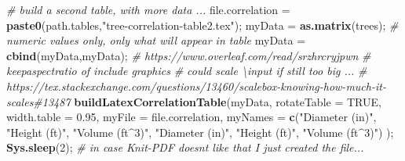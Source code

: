 \documentclass[]{article}
\newenvironment{Shaded}{\begin{snugshade}}{\end{snugshade}}
\newcommand{\CommentTok}[1]{\textcolor[rgb]{0.56,0.35,0.01}{\textit{#1}}}
\newcommand{\DataTypeTok}[1]{\textcolor[rgb]{0.13,0.29,0.53}{#1}}
\newcommand{\DecValTok}[1]{\textcolor[rgb]{0.00,0.00,0.81}{#1}}
\newcommand{\FloatTok}[1]{\textcolor[rgb]{0.00,0.00,0.81}{#1}}
\newcommand{\KeywordTok}[1]{\textcolor[rgb]{0.13,0.29,0.53}{\textbf{#1}}}
\newcommand{\NormalTok}[1]{#1}
\newcommand{\OtherTok}[1]{\textcolor[rgb]{0.56,0.35,0.01}{#1}}
\newcommand{\StringTok}[1]{\textcolor[rgb]{0.31,0.60,0.02}{#1}}
\begin{document}
\begin{Shaded}
\begin{Highlighting}[]
\CommentTok{\# build a second table, with more data ... }
\NormalTok{file.correlation =}\StringTok{ }\KeywordTok{paste0}\NormalTok{(path.tables,}\StringTok{"tree{-}correlation{-}table2.tex"}\NormalTok{);}
\NormalTok{myData =}\StringTok{ }\KeywordTok{as.matrix}\NormalTok{(trees);  }\CommentTok{\# numeric values only, only what will appear in table}
\NormalTok{myData =}\StringTok{ }\KeywordTok{cbind}\NormalTok{(myData,myData);}
\CommentTok{\# https://www.overleaf.com/read/srzhrcryjpwn}
\CommentTok{\# keepaspectratio of include graphics }
\CommentTok{\# could scale \textbackslash{}input if still too big ...}
\CommentTok{\# https://tex.stackexchange.com/questions/13460/scalebox{-}knowing{-}how{-}much{-}it{-}scales\#13487}
\KeywordTok{buildLatexCorrelationTable}\NormalTok{(myData, }
  \DataTypeTok{rotateTable =} \OtherTok{TRUE}\NormalTok{,}
  \DataTypeTok{width.table =} \FloatTok{0.95}\NormalTok{,}
  \DataTypeTok{myFile =}\NormalTok{ file.correlation,}
  \DataTypeTok{myNames =} \KeywordTok{c}\NormalTok{(}\StringTok{"Diameter (in)"}\NormalTok{, }\StringTok{"Height (ft)"}\NormalTok{, }\StringTok{"Volume (ft$\^{}3$)"}\NormalTok{, }\StringTok{"Diameter (in)"}\NormalTok{, }\StringTok{"Height (ft)"}\NormalTok{, }\StringTok{"Volume (ft$\^{}3$)"}\NormalTok{) );}
\KeywordTok{Sys.sleep}\NormalTok{(}\DecValTok{2}\NormalTok{); }\CommentTok{\# in case Knit{-}PDF doesn\textquotesingle{}t like that I just created the file...}
\end{Highlighting}
\end{Shaded}

\newpage



\newpage






\newpage
\theendnotes

\newpage
\begin{auxmulticols}{2}
\singlespacing 
\end{auxmulticols}

\newpage
{
\hypersetup{linkcolor=black}
\setcounter{tocdepth}{3}
\tableofcontents
}
\end{document}
